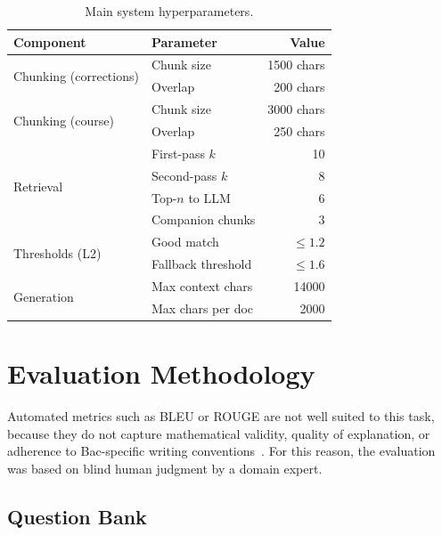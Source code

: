 \begin{table}[H]
\centering
\caption{Main system hyperparameters.}
\label{tab:hyperparameters}
\begin{tabular}{llr}
\toprule
\textbf{Component} & \textbf{Parameter} & \textbf{Value} \\
\midrule
\multirow{2}{*}{Chunking (corrections)} & Chunk size & 1500 chars \\
                                         & Overlap & 200 chars \\
\multirow{2}{*}{Chunking (course)}      & Chunk size & 3000 chars \\
                                         & Overlap & 250 chars \\
\midrule
\multirow{4}{*}{Retrieval}              & First-pass $k$ & 10 \\
                                         & Second-pass $k$ & 8 \\
                                         & Top-$n$ to LLM & 6 \\
                                         & Companion chunks & 3 \\
\midrule
\multirow{2}{*}{Thresholds (L2)}        & Good match & $\leq 1.2$ \\
                                         & Fallback threshold & $\leq 1.6$ \\
\midrule
\multirow{2}{*}{Generation}             & Max context chars & 14000 \\
                                         & Max chars per doc & 2000 \\
\bottomrule
\end{tabular}
\end{table}

\section{Evaluation Methodology}
\label{subsec:evaluation-methodology}
\label{subsec:eval-setup}

Automated metrics such as BLEU or ROUGE are not well suited to this task,
because they do not capture mathematical validity, quality of explanation,
or adherence to Bac-specific writing conventions~\cite{kasneci2023chatgpt_education}.
For this reason, the evaluation was based on blind human judgment by a
domain expert.

\subsection{Question Bank}

